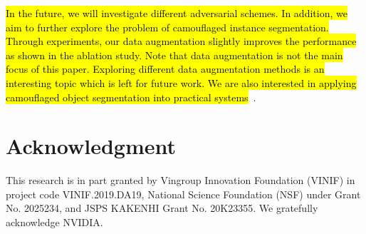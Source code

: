 \documentclass[journal]{IEEEtran}
\DeclareRobustCommand{\hlcyan}[1]{{\sethlcolor{white}\hl{#1}}}
\begin{document}
\hlcyan{In the future, we will investigate different adversarial schemes. In addition, we aim to further explore the problem of camouflaged instance segmentation. Through experiments, our data augmentation slightly improves the performance as shown in the ablation study. Note that data augmentation is not the main focus of this paper. Exploring different data augmentation methods is an interesting topic which is left for future work. We are also interested in applying camouflaged object segmentation into practical systems}~\cite{TamIJCV}. 


\section*{Acknowledgment}

This research is in part granted by Vingroup Innovation Foundation (VINIF) in project code VINIF.2019.DA19, National Science Foundation (NSF) under Grant No. 2025234, and JSPS KAKENHI Grant No. 20K23355. We gratefully acknowledge NVIDIA.



\ifCLASSOPTIONcaptionsoff
  \newpage
\fi

 \balance





















\vfill 
\end{document}

